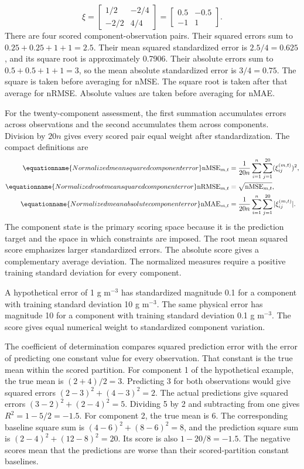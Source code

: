 \[
\xi=\begin{bmatrix}1/2&-2/4\\-2/2&4/4\end{bmatrix}
=\begin{bmatrix}0.5&-0.5\\-1&1\end{bmatrix}.
\]
There are four scored component-observation pairs. Their squared errors sum to $0.25+0.25+1+1=2.5$. Their mean squared standardized error is $2.5/4=0.625$, and its square root is approximately 0.7906. Their absolute errors sum to $0.5+0.5+1+1=3$, so the mean absolute standardized error is $3/4=0.75$. The square is taken before averaging for nMSE. The square root is taken after that average for nRMSE. Absolute values are taken before averaging for nMAE.

For the twenty-component assessment, the first summation accumulates errors across observations and the second accumulates them across components. Division by $20n$ gives every scored pair equal weight after standardization. The compact definitions are
\begin{align}
\equationname{Normalized mean squared component error}
\mathrm{nMSE}_{m,t}&=\frac{1}{20n}\sum_{i=1}^{n}\sum_{j=1}^{20}(\xi_{ij}^{(m,t)})^2,\label{eq:projection_nmse}\\
\equationname{Normalized root mean squared component error}
\mathrm{nRMSE}_{m,t}&=\sqrt{\mathrm{nMSE}_{m,t}},\label{eq:projection_nrmse}\\
\equationname{Normalized mean absolute component error}
\mathrm{nMAE}_{m,t}&=\frac{1}{20n}\sum_{i=1}^{n}\sum_{j=1}^{20}|\xi_{ij}^{(m,t)}|.
\label{eq:projection_nmae}
\end{align}
The component state is the primary scoring space because it is the prediction target and the space in which constraints are imposed. The root mean squared score emphasizes larger standardized errors. The absolute score gives a complementary average deviation. The normalized measures require a positive training standard deviation for every component.

A hypothetical error of 1 g m$^{-3}$ has standardized magnitude 0.1 for a component with training standard deviation 10 g m$^{-3}$. The same physical error has magnitude 10 for a component with training standard deviation 0.1 g m$^{-3}$. The score gives equal numerical weight to standardized component variation.

The coefficient of determination compares squared prediction error with the error of predicting one constant value for every observation. That constant is the true mean within the scored partition. For component 1 of the hypothetical example, the true mean is $(2+4)/2=3$. Predicting 3 for both observations would give squared errors $(2-3)^2+(4-3)^2=2$. The actual predictions give squared errors $(3-2)^2+(2-4)^2=5$. Dividing 5 by 2 and subtracting from one gives $R^2=1-5/2=-1.5$. For component 2, the true mean is 6. The corresponding baseline square sum is $(4-6)^2+(8-6)^2=8$, and the prediction square sum is $(2-4)^2+(12-8)^2=20$. Its score is also $1-20/8=-1.5$. The negative scores mean that the predictions are worse than their scored-partition constant baselines.

